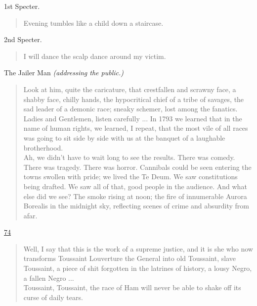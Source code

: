 \documentclass[letterpaper,article,12pt,oneside,notitlepage]{memoir}
\begin{document}
\begin{center}1st Specter.\end{center}

\begin{verse}
Evening tumbles like a child down a staircase. \\
\end{verse}

\begin{center}2nd Specter.\end{center}

\begin{verse}
I will dance the scalp dance around my victim. \\
\end{verse}

\begin{center}The Jailer Man \textit{(addressing the public.)}\end{center}

\begin{verse}
Look at him, quite the caricature, that crestfallen and scrawny face, a shabby face, chilly hands, the hypocritical chief of a tribe of savages, the sad leader of a demonic race; sneaky schemer, lost among the fanatics. \\
\indent Ladies and Gentlemen, listen carefully ... In 1793 we learned that in the name of human rights, we learned, I repeat, that the most vile of all races was going to sit side by side with us at the banquet of a laughable brotherhood. \\
\indent Ah, we didn't have to wait long to see the results. There was comedy. There was tragedy. There was horror. Cannibals could be seen entering the towns swollen with pride; we lived the Te Deum. We saw constitutions being drafted. We saw all of that, good people in the audience. And what else did we see? The smoke rising at noon; the fire of innumerable Aurora Borealis in the midnight sky, reflecting scenes of crime and absurdity from afar. \\
\end{verse}

\clearpage

\href{http://cesaire.elotroalex.com/chiens/chiens/p074.html}{74}

\begin{verse}
\indent Well, I say that this is the work of a supreme justice, and it is she who now transforms Toussaint Louverture the General into old Toussaint, slave Toussaint, a piece of shit forgotten in the latrines of history, a lousy Negro, a fallen Negro ... \\
\indent Toussaint, Toussaint, the race of Ham will never be able to shake off its curse of daily tears. \\
\end{verse}
\end{document}

